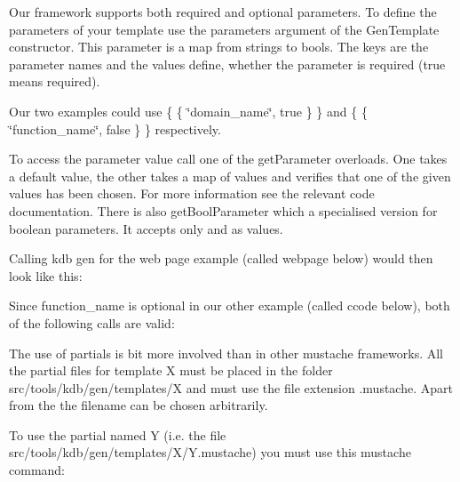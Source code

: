 Our framework supports both required and optional parameters. To define the parameters of your template use the {\ttfamily parameters} argument of the {\ttfamily Gen\+Template} constructor. This parameter is a map from strings to bools. The keys are the parameter names and the values define, whether the parameter is required ({\ttfamily true} means required).

Our two examples could use {\ttfamily \{ \{ \char`\"{}domain\+\_\+name\char`\"{}, true \} \}} and {\ttfamily \{ \{ \char`\"{}function\+\_\+name\char`\"{}, false \} \}} respectively.

To access the parameter value call one of the {\ttfamily get\+Parameter} overloads. One takes a default value, the other takes a map of values and verifies that one of the given values has been chosen. For more information see the relevant code documentation. There is also {\ttfamily get\+Bool\+Parameter} which a specialised version for boolean parameters. It accepts only {} and {} as values.

Calling {\ttfamily kdb gen} for the web page example (called {\ttfamily webpage} below) would then look like this\+:


\begin{DoxyCode}{0}
\end{DoxyCode}


Since {\ttfamily function\+\_\+name} is optional in our other example (called {\ttfamily ccode} below), both of the following calls are valid\+:


\begin{DoxyCode}{0}
\DoxyCodeLine{}
\end{DoxyCode}


The use of partials is bit more involved than in other mustache frameworks. All the partial files for template {\ttfamily X} must be placed in the folder {\ttfamily src/tools/kdb/gen/templates/X} and must use the file extension {\ttfamily .mustache}. Apart from the the filename can be chosen arbitrarily.

To use the partial named {\ttfamily Y} (i.\+e. the file {\ttfamily src/tools/kdb/gen/templates/\+X/\+Y.\+mustache}) you must use this mustache command\+:


\begin{DoxyCode}{0}
\end{DoxyCode}


